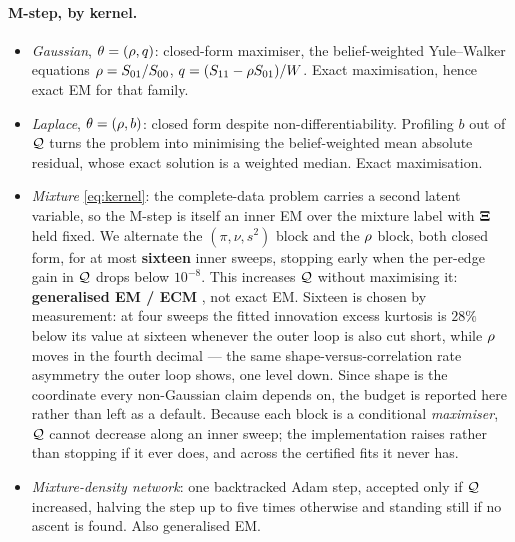\paragraph{M-step, by kernel.}
\begin{itemize}\itemsep2pt
\item \emph{Gaussian}, $\theta=(\rho,q)$: closed-form maximiser, the belief-weighted
      Yule--Walker equations $\rho = S_{01}/S_{00}$, $q = (S_{11}-\rho S_{01})/W$. Exact
      maximisation, hence exact EM for that family.
\item \emph{Laplace}, $\theta=(\rho,b)$: closed form despite non-differentiability. Profiling
      $b$ out of $\mathcal{Q}$ turns the problem into minimising the belief-weighted mean absolute
      residual, whose exact solution is a weighted median. Exact maximisation.
\item \emph{Mixture} \eqref{eq:kernel}: the complete-data problem carries a second latent
      variable, so the M-step is itself an inner EM over the mixture label with
      $\mathbf{\Xi}$ held fixed. We alternate the $(\pi,\nu,s^2)$ block and the $\rho$ block, both
      closed form, for at most \textbf{sixteen} inner sweeps, stopping early when the per-edge
      gain in $\mathcal{Q}$ drops below $10^{-8}$. This increases $\mathcal{Q}$
      without maximising it: \textbf{generalised EM / ECM} \citep{meng1993maximum}, not exact EM.
      Sixteen is chosen by measurement: at four sweeps the fitted innovation excess kurtosis
      is $28\%$ below its value at sixteen whenever the outer loop is also cut short, while
      $\rho$ moves in the fourth decimal --- the same shape-versus-correlation rate asymmetry
      the outer loop shows, one level down. Since shape is the coordinate every non-Gaussian
      claim depends on, the budget is reported here rather than left as a default.
      Because each block is a conditional \emph{maximiser}, $\mathcal{Q}$ cannot decrease along an
      inner sweep; the implementation raises rather than stopping if it ever does, and across
      the certified fits it never has.
\item \emph{Mixture-density network}: one backtracked Adam step, accepted only if $\mathcal{Q}$
      increased, halving the step up to five times otherwise and standing still if no ascent is
      found. Also generalised EM.
\end{itemize}

